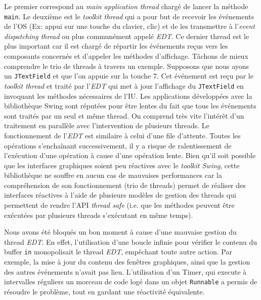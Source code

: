 Le premier correspond au \emph{main application thread} chargé de lancer la méthode \texttt{main}. Le deuxième est le \emph{toolkit thread} qui a pour but de recevoir les événements de l'OS (Ex: appui sur une touche du clavier, clic) et de les transmettre à l'\emph{event dispatching thread} ou plus communément appelé \emph{EDT}. Ce dernier thread est le plus important car il est chargé de répartir les événements reçus vers les composants concernés et d’appeler les méthodes d’affichage.
Tâchons de mieux comprendre le trio de threads à travers un exemple. Supposons que nous ayons un \texttt{JTextField} et que l’on appuie sur la touche 7. Cet événement est reçu par le \emph{toolkit thread} et traité par l’\emph{EDT} qui met à jour l’affichage du \texttt{JTextField} en invoquant les méthodes nécessaires de l’IU.
Les applications développées avec la bibliothèque Swing sont réputées pour être lentes du fait que tous les événements sont traités par un seul et même thread. On comprend très vite l’intérêt d’un traitement en parallèle avec l’intervention de plusieurs threads. Le fonctionnement de l’\emph{EDT} est similaire à celui d’une file d’attente. Toutes les opérations s’enchaînant successivement, il y a risque de ralentissement de l’exécution d’une opération à cause d’une opération lente. Bien qu’il soit possible que les interfaces graphiques soient peu réactives avec le \emph{toolkit Swing}, cette bibliothèque ne souffre en aucun cas de mauvaises performances car la compréhension de son fonctionnement (trio de threads) permet de réaliser des interfaces réactives à l’aide de plusieurs modèles de gestion des threads qui permettent de rendre l’API \emph{thread safe} (i.e. que les méthodes peuvent être exécutées par plusieurs threads s’exécutant en même temps).

\par Nous avons été bloqués un bon moment à cause d'une mauvaise gestion du thread \emph{EDT}. En effet, l'utilisation d'une boucle infinie pour vérifier le contenu du buffer \texttt{in} monopolisait le thread \emph{EDT}, empêchant toute autre action. Par exemple, la mise à jour du contenu des fenêtres graphiques, ainsi que la gestion des autres événements n'avait pas lieu. L'utilisation d'un Timer, qui execute à intervalles réguliers un morceau de code logé dans un objet \texttt{Runnable} a permis de résoudre le problème, tout en gardant une réactivité équivalente.



